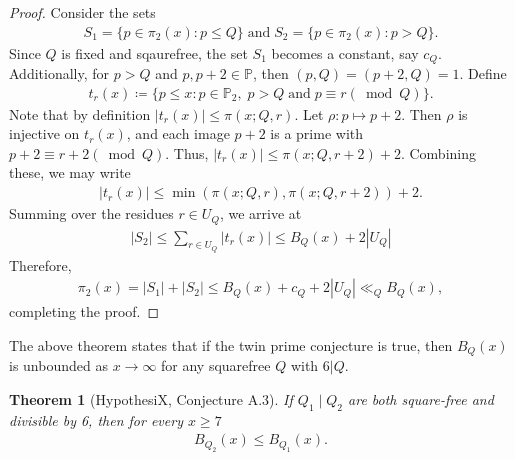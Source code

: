 \documentclass[11pt,reqno]{amsart}
\theoremstyle{plain}\newtheorem{theorem}{Theorem}[section]
\numberwithin{equation}{section}
\begin{document}
\begin{proof}
Consider the sets
\begin{align*}
S_1
=\{p\in\pi_2(x): p\leq Q\} \;\text{and}\; 
S_2
=\{p\in\pi_2(x): p> Q\}.
\end{align*}
\noindent
Since $Q$ is fixed and sqaurefree, the set $S_1$ becomes a constant, say $c_Q$. Additionally, for $p>Q$ and $p,p+2\in\mathbb{P}$, then $(p,Q)=(p+2,Q)=1$. Define
\begin{align*}
t_r(x)
\coloneqq\{p\leq x: p\in\mathbb{P}_2,\;p>Q\;\text{and}\;p\equiv r(\bmod{Q})\}.
\end{align*}
\noindent
Note that by definition $|t_r(x)|\leq\pi(x;Q,r)$. Let $\rho:p\mapsto p+2$. Then $\rho$ is injective on $t_r(x)$, and each image $p+2$ is a prime with $p+2\equiv r+2(\bmod Q)$. Thus, $|t_r(x)|\leq\pi(x;Q,r+2)+2$. Combining these, we may write
\begin{align*}
|t_r(x)|
\leq\min(\pi(x;Q,r),\pi(x;Q,r+2))+2.
\end{align*}
\noindent
Summing over the residues $r\in U_Q$, we arrive at
\begin{align*}
|S_2|\leq \sum_{r\in U_Q}|t_r(x)|
\leq B_Q(x)+2|U_Q|
\end{align*}
Therefore,
\begin{align*}
\pi_2(x)
=|S_1|+|S_2|
\leq B_Q(x)+c_Q+2|U_Q|
\ll_Q B_Q(x),
\end{align*}
completing the proof.
\end{proof}
\noindent
The above theorem states that if the twin prime conjecture is true, then $B_Q(x)$ is unbounded as $x\to\infty$ for any squarefree $Q$ with $6|Q$.

\begin{theorem}[HypothesiX, Conjecture A.3]\label{monotonerefinement}
If $Q_1 \mid Q_2$ are both square-free and divisible by 6, then for every $x \geq 7$
\begin{align*}
B_{Q_2}(x) \leq B_{Q_1}(x).    
\end{align*}
\end{theorem}
\end{document}
